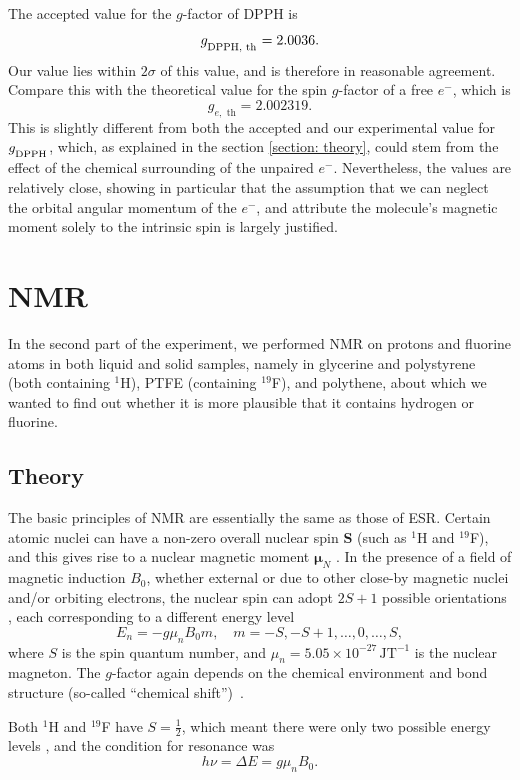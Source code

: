 \documentclass[a4paper]{jpconf}
\numberwithin{equation}{section}
\begin{document}
The accepted value for the $g$-factor of DPPH is
\[
	g_{\textsubscript{DPPH, th}} = 2.0036.
\]
Our value lies within $2\sigma$ of this value, and is therefore in reasonable agreement.
Compare this with the theoretical value for the spin $g$-factor of a free $e^-$, which is
\[
	g_{e,\text{ th}} = 2.002319.
\]
This is slightly different from both the accepted and our experimental value for $g_{\textsubscript{DPPH}}$, which, as explained in the section \ref{section: theory}, could stem from the effect of the chemical surrounding of the unpaired $e^-$. Nevertheless, the values are relatively close, showing in particular that the assumption that we can neglect the orbital angular momentum of the $e^-$, and attribute the molecule's magnetic moment solely to the intrinsic spin is largely justified.


\section{NMR} 
In the second part of the experiment, we performed NMR on protons and fluorine atoms in both liquid and solid samples, namely in glycerine and polystyrene (both containing ${}^1$H), PTFE (containing ${}^{19}$F), and polythene, about which we wanted to find out whether it is more plausible that it contains hydrogen or fluorine.
\subsection{Theory}

The basic principles of NMR are essentially the same as those of ESR. Certain atomic nuclei can have a non-zero overall nuclear spin $\mathbf{S}$ (such as ${}^1$H and ${}^{19}$F), and this gives rise to a nuclear magnetic moment $\bm{\mu}_N$ \cite{Smith, Gero}. In the presence of a field of magnetic induction $B_0$, whether external or due to other close-by magnetic nuclei and/or orbiting electrons, the nuclear spin can adopt $2S + 1$ possible orientations \cite{Gero, Ball}, each corresponding to a different energy level
\[
	E_n = -g \mu_n B_0 m, \quad m = -S, -S+1, \dots, 0, \dots, S, 
\] 
where $S$ is the spin quantum number, and $\mu_n = 5.05 \times 10^{-27} \, \si{\joule\tesla\tothe{-1}}$ is the nuclear magneton.
The $g$-factor again depends on the chemical environment and bond structure (so-called ``chemical shift'')~\cite{Ball}. 

Both ${}^1$H and ${}^{19}$F have $S = \tfrac{1}{2}$, which meant there were only two possible energy levels \cite{MacLaren, Gero}, and the condition for resonance was 
\begin{equation}\label{eqn: NMR resonance condition}
	h\nu = \Delta E = g \mu_n B_0.
\end{equation}
\end{document}
